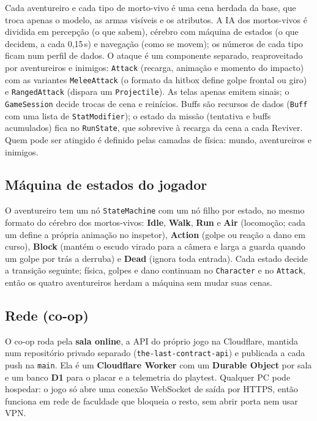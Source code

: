 \documentclass[11pt,a4paper]{article}
\begin{document}
Cada aventureiro e cada tipo de morto-vivo é uma cena herdada da base, que troca apenas o modelo, as armas visíveis e os atributos. A IA dos mortos-vivos é dividida em percepção (o que sabem), cérebro com máquina de estados (o que decidem, a cada 0,15\,s) e navegação (como se movem); os números de cada tipo ficam num perfil de dados. O ataque é um componente separado, reaproveitado por aventureiros e inimigos: \texttt{Attack} (recarga, animação e momento do impacto) com as variantes \texttt{MeleeAttack} (o formato da hitbox define golpe frontal ou giro) e \texttt{RangedAttack} (dispara um \texttt{Projectile}). As telas apenas emitem sinais; o \texttt{GameSession} decide trocas de cena e reinícios. Buffs são recursos de dados (\texttt{Buff} com uma lista de \texttt{StatModifier}); o estado da missão (tentativa e buffs acumulados) fica no \texttt{RunState}, que sobrevive à recarga da cena a cada Reviver. Quem pode ser atingido é definido pelas camadas de física: mundo, aventureiros e inimigos.

\subsection{Máquina de estados do jogador}

O aventureiro tem um nó \texttt{StateMachine} com um nó filho por estado, no mesmo formato do cérebro dos mortos-vivos: \textbf{Idle}, \textbf{Walk}, \textbf{Run} e \textbf{Air} (locomoção; cada um define a própria animação no inspetor), \textbf{Action} (golpe ou reação a dano em curso), \textbf{Block} (mantém o escudo virado para a câmera e larga a guarda quando um golpe por trás a derruba) e \textbf{Dead} (ignora toda entrada). Cada estado decide a transição seguinte; física, golpes e dano continuam no \texttt{Character} e no \texttt{Attack}, então os quatro aventureiros herdam a máquina sem mudar suas cenas.

\subsection{Rede (co-op)}

O co-op roda pela \textbf{sala online}, a API do próprio jogo na Cloudflare, mantida num repositório privado separado (\texttt{the-last-contract-api}) e publicada a cada push na \texttt{main}. Ela é um \textbf{Cloudflare Worker} com um \textbf{Durable Object} por sala e um banco \textbf{D1} para o placar e a telemetria do playtest. Qualquer PC pode hospedar: o jogo só abre uma conexão WebSocket de saída por HTTPS, então funciona em rede de faculdade que bloqueia o resto, sem abrir porta nem usar VPN.
\end{document}
